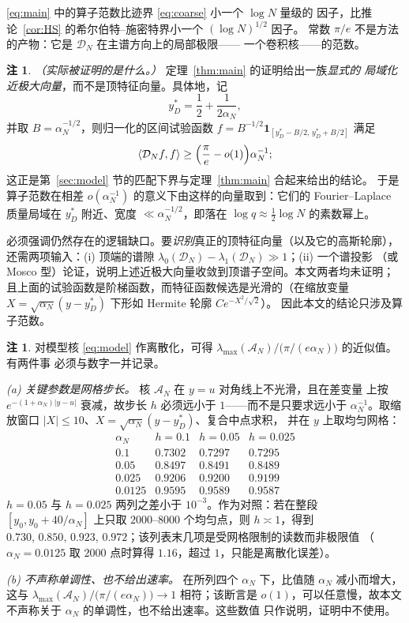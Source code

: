 \documentclass[12pt,a4paper]{amsart}
\numberwithin{equation}{section}
\theoremstyle{plain}
\theoremstyle{definition}
\newtheorem{remark}[theorem]{注}
\begin{document}
\eqref{eq:main} 中的算子范数比迹界 \eqref{eq:coarse} 小一个 $\log N$ 量级的
因子，比推论~\ref{cor:HS} 的希尔伯特--施密特界小一个 $(\log N)^{1/2}$ 因子。
常数 $\pi/e$ 不是方法的产物：它是 $\mathcal D_N$ 在主谱方向上的局部极限——
一个卷积核——的范数。

\begin{remark}\label{rem:eigenvector}
\emph{（实际被证明的是什么。）} 定理~\ref{thm:main} 的证明给出一族\emph{显式的
局域化近极大向量}，而不是顶特征向量。具体地，记
\begin{equation}\label{eq:peakpoint}
 y_D^*=\frac12+\frac1{2\alpha_N},
\end{equation}
并取 $B=\alpha_N^{-1/2}$，则归一化的区间试验函数
$f=B^{-1/2}\mathbf 1_{[y_D^*-B/2,\,y_D^*+B/2]}$ 满足
\[
 \langle\mathcal D_Nf,f\rangle\ge\Bigl(\frac{\pi}{e}-o(1)\Bigr)\alpha_N^{-1};
\]
这正是第~\ref{sec:model} 节的匹配下界与定理~\ref{thm:main} 合起来给出的结论。
于是算子范数在相差 $o(\alpha_N^{-1})$ 的意义下由这样的向量取到：它们的
Fourier--Laplace 质量局域在 $y_D^*$ 附近、宽度 $\ll\alpha_N^{-1/2}$，即落在
$\log q\approx\frac12\log N$ 的素数幂上。

必须强调仍然存在的逻辑缺口。要\emph{识别}真正的顶特征向量（以及它的高斯轮廓），
还需两项输入：(i) 顶端的谱隙
$\lambda_0(\mathcal D_N)-\lambda_1(\mathcal D_N)\gg1$；(ii) 一个谱投影
（或 Mosco 型）论证，说明上述近极大向量收敛到顶谱子空间。本文两者均未证明；
且上面的试验函数是阶梯函数，而特征函数候选是光滑的（在缩放变量
$X=\sqrt{\alpha_N}(y-y_D^*)$ 下形如 Hermite 轮廓 $Ce^{-X^2/\sqrt2}$）。
因此本文的结论只涉及算子范数。
\end{remark}

\begin{remark}\label{rem:numerical}
对模型核 \eqref{eq:model} 作离散化，可得
$\lambda_{\max}(\mathscr A_N)\big/\bigl(\pi/(e\alpha_N)\bigr)$ 的近似值。有两件事
必须与数字一并记录。

\emph{(a) 关键参数是网格步长。} 核 $\mathscr A_N$ 在 $y=u$ 对角线上不光滑，且在差变量
上按 $e^{-(1+\alpha_N)|y-u|}$ 衰减，故步长 $h$ 必须远小于 $1$——而不是只要求远小于
$\alpha_N^{-1}$。取缩放窗口 $|X|\le10$、$X=\sqrt{\alpha_N}(y-y_D^*)$、复合中点求积，
并在 $y$ 上取均匀网格：
\[
\begin{array}{c|ccc}
\alpha_N & h=0.1 & h=0.05 & h=0.025\\ \hline
0.1    & 0.7302 & 0.7297 & 0.7295\\
0.05   & 0.8497 & 0.8491 & 0.8489\\
0.025  & 0.9206 & 0.9200 & 0.9199\\
0.0125 & 0.9595 & 0.9589 & 0.9587
\end{array}
\]
$h=0.05$ 与 $h=0.025$ 两列之差小于 $10^{-3}$。作为对照：若在整段
$[y_0,y_0+40/\alpha_N]$ 上只取 $2000$--$8000$ 个均匀点，则 $h\asymp1$，得到
$0.730,\,0.850,\,0.923,\,0.972$；该列表末几项是受网格限制的读数而非极限值
（$\alpha_N=0.0125$ 取 $2000$ 点时算得 $1.16$，超过 $1$，只能是离散化误差）。

\emph{(b) 不声称单调性、也不给出速率。} 在所列四个 $\alpha_N$ 下，比值随
$\alpha_N$ 减小而增大，这与
$\lambda_{\max}(\mathscr A_N)\big/\bigl(\pi/(e\alpha_N)\bigr)\to1$ 相符；该断言是
$o(1)$，可以任意慢，故本文不声称关于 $\alpha_N$ 的单调性，也不给出速率。这些数值
只作说明，证明中不使用。
\end{remark}
\end{document}
